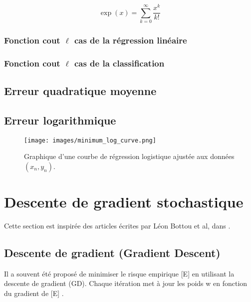 	\[\exp(x)=\sum_{k=0}^{\infty}\frac{x^k}{k!}\]
	\lipsum[4]
	\subsubsection{Fonction cout $\ell$ cas de la régression linéaire}
	\lipsum[1]
	\subsubsection{Fonction cout $\ell$ cas  de la classification}
	\lipsum[1]
	
	\subsection{Erreur quadratique moyenne }
	\lipsum[1] %
	\subsection{Erreur logarithmique}
	\lipsum[1]
	\begin{figure}[hth]%
		\centering
		\texttt{[image: images/minimum\_log\_curve.png]}
		\caption{Graphique d'une courbe de régression logistique ajustée aux données $(x_n , y_n)$. \cite[image de]{ml2008python}
		}
		\label{fig:minimum_log_curve}
	\end{figure}
	
	
	
	
	\section{Descente de gradient stochastique}
	Cette section est inspirée des articles écrites par Léon Bottou et al, dans  \cite{bottou2012stochastic} 
	\cite{bottou2010large}
	\cite{framling2004scaled}
	\cite{bottou2018optimization}
	\cite{netrapalli2019stochastic}
	\cite{wijnhoven2010fast}.
	
	\subsection{Descente de gradient (Gradient Descent)}
	
	
	Il a souvent été proposé de minimiser le risque empirique [E] en utilisant la descente de gradient (GD). Chaque itération met à jour les poids w en fonction du gradient de [E] \cite{bottou2012stochastic}.\\
	
